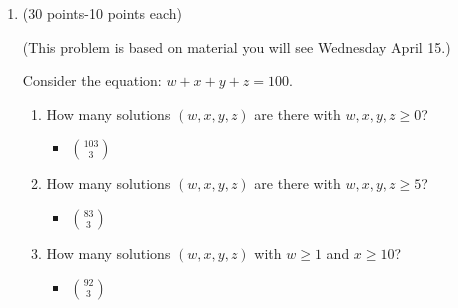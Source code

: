 \documentclass[12pt]{article}
\begin{document}
\begin{enumerate}
There are 5 taking all three classes. 

\begin{enumerate}
\item 
How many students are there?\\ 
\textbf{We have to account for people that were multiple counted. So we have $30+30+30-10-10-10+5$ = 65 students}
\item
How many students are taking Game Theory AND Ramsey Theory but NOT AI?
\end{enumerate}
\textbf{We can split the 10 students taking Game Theory and Ramsey Theory into the 5 students taking all three classes and the 5 remaining students, which is the answer here. So, 5 Students.}

\vfill 

\centerline{\bf GO TO THE NEXT PAGE}

\newpage


\item 
(30 points-10 points each)

(This problem is based on material you will see Wednesday April 15.) 


Consider the equation: $w+x+y+z=100.$

\begin{enumerate}
\item 
How many solutions $(w,x,y,z)$ are there with $w,x,y,z\ge 0$?
\begin{itemize}
    \item{$103\choose 3$}
\end{itemize}

\item
How many solutions $(w,x,y,z)$ are there with $w,x,y,z\ge 5$?
\begin{itemize}
    \item{$83\choose 3$}
\end{itemize}
\item
How many solutions $(w,x,y,z)$ with $w\ge 1$ and $x\ge 10$? 
\begin{itemize}
    \item{$92\choose 3$}
\end{itemize}
\end{enumerate}

\end{enumerate}
\end{document}
